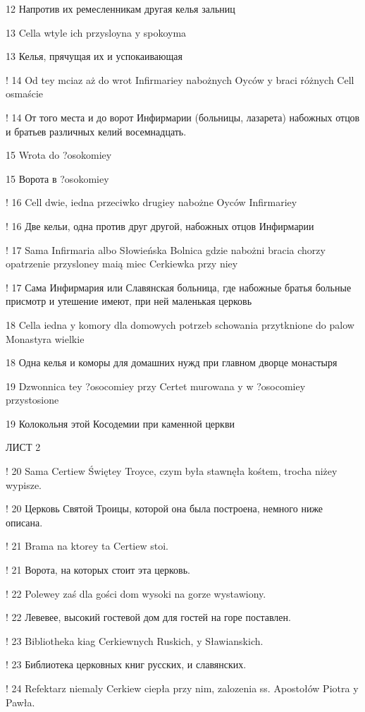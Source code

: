 12 Напротив их ремесленникам другая келья зальниц

13 Cella wtyle ich przysloyna y spokoyma

13 Келья, прячущая их и успокаивающая

! 14 Od tey mciaz aż do wrot Infirmariey nabożnych Oyców y braci różnych Cell osmaście

! 14 От того места и до ворот Инфирмарии (больницы, лазарета) набожных отцов и братьев различных келий восемнадцать.

15 Wrota do ?osokomiey

15 Ворота в ?osokomiey

! 16 Cell dwie, iedna przeciwko drugiey nabożne Oyców Infirmariey

! 16 Две кельи, одна против друг другой, набожных отцов Инфирмарии

! 17 Sama Infirmaria albo Słowieńska Bolnica gdzie nabożni bracia chorzy opatrzenie przysloney maią miec Cerkiewka przy niey

! 17 Сама Инфирмария или Славянская больница, где набожные братья больные присмотр и утешение имеют, при ней маленькая церковь

18 Cella iedna y komory dla domowych potrzeb schowania przytknione do palow Monastyra wielkie

18 Одна келья и коморы для домашних нужд при главном дворце монастыря

19 Dzwonnica tey ?osocomiey przy Certet murowana y w ?osocomiey przystosione

19 Колокольня этой Косодемии при каменной церкви

ЛИСТ 2



! 20 Sama Certiew Świętey Troyce, czym była stawnęła kośtem, trocha niżey wypisze.

! 20 Церковь Святой Троицы, которой она была построена, немного ниже описана.

! 21 Brama na ktorey ta Certiew stoi.

! 21 Ворота, на которых стоит эта церковь.

! 22 Polewey zaś dla gości dom wysoki na gorze wystawiony.

! 22 Левевее, высокий гостевой дом для гостей на горе поставлен.

! 23 Bibliotheka kiag Cerkiewnych Ruskich, y Sławianskich.

! 23 Библиотека церковных книг русских, и славянских.

! 24 Refektarz niemaly Cerkiew ciepła przy nim, zalozenia ss. Apostołów Piotra y Pawła.

